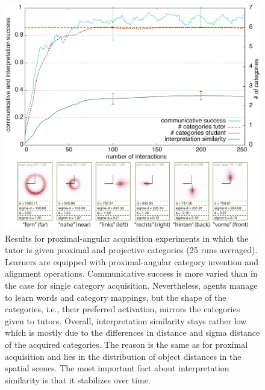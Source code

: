 \begin{figure}
\begin{center}
\includegraphics[width=0.9\columnwidth]{figs/category-acquisition-proximal-angular-results+categories}
\end{center}
\caption[Results for proximal-angular acquisition experiments]{
Results for proximal-angular acquisition experiments in which the tutor
is given proximal and projective categories (25 runs averaged). Learners are 
equipped with proximal-angular category invention and alignment operations.
Communicative success is more varied than in the case for single category acquisition.
Nevertheless, agents manage to learn words and category mappings, but the shape 
of the categories, i.e., their preferred activation, mirrors the categories given to tutors. 
Overall, interpretation similarity stays rather low which is mostly due to the differences 
in distance and sigma distance of the acquired categories. The reason is the same as
for proximal acquisition and lies in the distribution of object distances in the spatial scenes. 
The most important fact about interpretation similarity is that it stabilizes over time.}
\label{f:category-acquisition-proximal-angular-results}
\end{figure}

